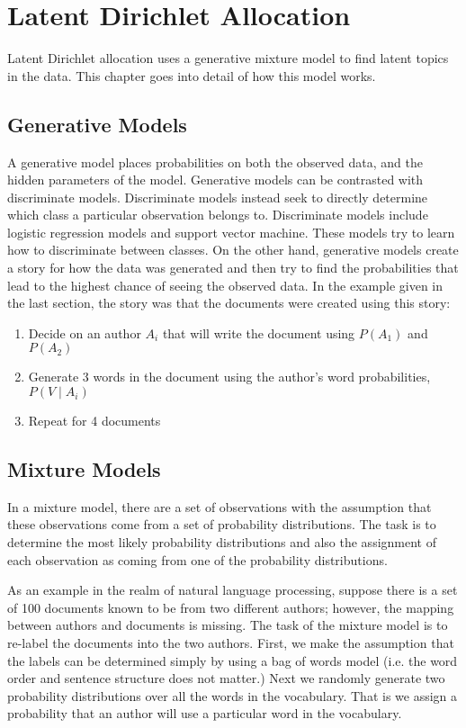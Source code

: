 \chapter{Latent Dirichlet Allocation}

Latent Dirichlet allocation uses a generative mixture model to find latent topics in the data.  This chapter goes into detail of how this model works.

\section{Generative Models}
A generative model places probabilities on both the observed data, and the hidden parameters of the model.  Generative models can be contrasted with discriminate models.  Discriminate models instead seek to directly determine which class a particular observation belongs to.  Discriminate models include logistic regression models and support vector machine.  These models try to learn how to discriminate between classes.  On the other hand, generative models create a story for how the data was generated and then try to find the probabilities that lead to the highest chance of seeing the observed data.  In the example given in the last section, the story was that the documents were created using this story:
\begin{enumerate}
	\item Decide on an author $A_i$ that will write the document using $P(A_1)$ and $P(A_2)$
	\item Generate 3 words in the document using the author's word probabilities, $P(V \mid A_i)$
	\item Repeat for 4 documents
\end{enumerate}

\section{Mixture Models}
In a mixture model, there are a set of observations with the assumption that these observations come from a set of probability distributions.  The task is to determine the most likely probability distributions and also the assignment of each observation as coming from one of the probability distributions.  

As an example in the realm of natural language processing, suppose there is a set of 100 documents known to be from two different authors; however, the mapping between authors and documents is missing.  The task of the mixture model is to re-label the documents into the two authors.  First, we make the assumption that the labels can be determined simply by using a bag of words model (i.e. the word order and sentence structure does not matter.)    Next we randomly generate two probability distributions over all the words in the vocabulary.  That is we assign a probability that an author will use a particular word in the vocabulary.  

